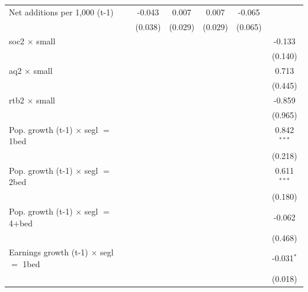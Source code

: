 \begin{table}[htbp]
\begin{tabular}{lccccc}
      Net additions per 1,000 (t-1)                          & -0.043        & 0.007         & 0.007        & -0.065  &   \\   
                                                             & (0.038)       & (0.029)       & (0.029)      & (0.065) &   \\   
      soc2 $\times$ small                                    &               &               &              &         & -0.133\\   
                                                             &               &               &              &         & (0.140)\\   
      aq2 $\times$ small                                     &               &               &              &         & 0.713\\   
                                                             &               &               &              &         & (0.445)\\   
      rtb2 $\times$ small                                    &               &               &              &         & -0.859\\   
                                                             &               &               &              &         & (0.965)\\   
      Pop. growth (t-1) $\times$ segl $=$ 1bed               &               &               &              &         & 0.842$^{***}$\\   
                                                             &               &               &              &         & (0.218)\\   
      Pop. growth (t-1) $\times$ segl $=$ 2bed               &               &               &              &         & 0.611$^{***}$\\   
                                                             &               &               &              &         & (0.180)\\   
      Pop. growth (t-1) $\times$ segl $=$ 4+bed              &               &               &              &         & -0.062\\   
                                                             &               &               &              &         & (0.468)\\   
      Earnings growth (t-1) $\times$ segl $=$ 1bed           &               &               &              &         & -0.031$^{*}$\\   
                                                             &               &               &              &         & (0.018)\\   

\end{tabular}
\end{table}
